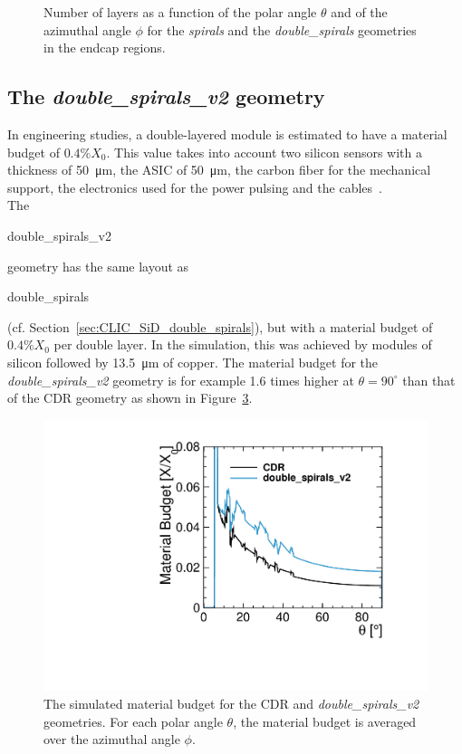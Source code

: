 \begin{figure}[H]
\begin{subfigure}[b]{0.5\textwidth}
          \caption{}
          \label{}
        \end{subfigure}
        \caption{Number of layers as a function of the polar angle
          $\theta$ and of the azimuthal angle $\phi$ for the {\it
            spirals} and the {\it double\_spirals} geometries in the endcap regions. }\label{fig:nbLayers_theta_phi}
\end{figure}
\subsection{The \emph{double\_spirals\_v2} geometry}\label{sec:CLIC_SiD_double_spirals_heavy}

In engineering studies, a double-layered module is estimated to have a material budget of $0.4\%X_{0}$. This value takes into account two silicon sensors with a thickness of \SI{50}{\micro\meter}, the ASIC of \SI{50}{\micro\meter}, the carbon fiber for the mechanical support, the electronics used for the power pulsing and the cables~\cite{Blanchot:1635206}. \\
The \begin{it}double\_spirals\_v2\end{it} geometry has the same layout
as \begin{it}double\_spirals\end{it}
(cf. Section~\ref{sec:CLIC_SiD_double_spirals}), but with a material
budget of $0.4\%X_{0}$ per double layer. In the simulation, this was
achieved by modules of silicon followed by \SI{13.5}{\micro\meter} of
copper. The material budget for the \textit{double\_spirals\_v2} geometry is for example 1.6 times higher at $\theta=90^{\circ}$ than that of the CDR geometry as shown in Figure~\ref{fig:material_budget_heavy_double_spirals}.

\begin{figure}[H]
  \centering
    \includegraphics[scale=0.4]{Figures/Geometries/material_budget_heavy_double_spirals.pdf}
    \caption{The simulated material budget for the CDR and {\it double\_spirals\_v2} geometries. For each polar angle $\theta$, the material budget is averaged over the azimuthal angle $\phi$.}
    \label{fig:material_budget_heavy_double_spirals}
\end{figure}
